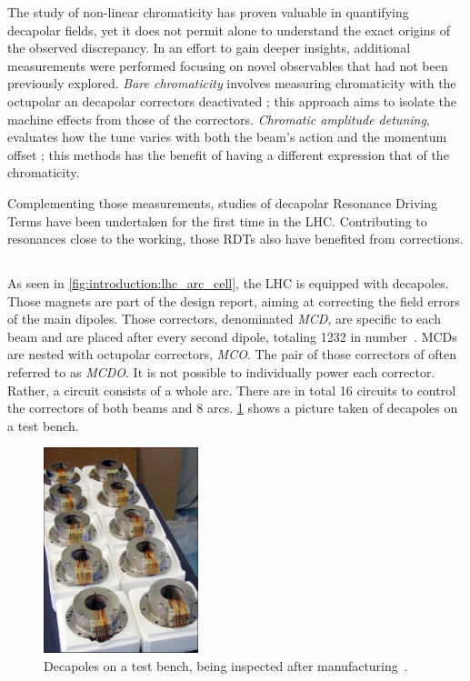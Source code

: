 The study of non-linear chromaticity has proven valuable in quantifying decapolar fields, yet it
does not permit alone to understand the exact origins of the observed discrepancy. In an effort to
gain deeper insights, additional measurements were performed focusing on novel observables that had
not been previously explored.
\textit{Bare chromaticity} involves measuring chromaticity with
the octupolar an decapolar correctors deactivated ; this approach aims to isolate the machine
effects from those of the correctors.
\textit{Chromatic amplitude detuning}, evaluates how the tune varies with both the beam's action and
the momentum offset ; this methods has the benefit of having a different expression that of the
chromaticity.

Complementing those measurements, studies of decapolar Resonance Driving Terms have been undertaken
for the first time in the LHC. Contributing to resonances close to the working, those RDTs also have
benefited from corrections.


\subsection{}

As seen in \cref{fig:introduction:lhc_arc_cell}, the LHC is equipped with decapoles. Those magnets
are part of the design report, aiming at correcting the field errors of the main dipoles.
Those correctors, denominated \textit{MCD}, are specific to each beam and are placed after every
second dipole, totaling 1232 in number~\cite{venturini_delsolaro_magnetic_2005}.
MCDs are nested with octupolar correctors, \textit{MCO}. The pair of those correctors of often
referred to as \textit{MCDO}. 
It is not possible to individually power each corrector. Rather, a circuit consists of a whole arc.
There are in total 16 circuits to control the correctors of both beams and 8 arcs.
\cref{fig:decapoles:decapole_picture} shows a picture taken of decapoles on a test bench.

\begin{figure}
    \centering
    \includegraphics[width=0.4\textwidth]{./images/decapoles_real_pic.jpg}
    \caption{Decapoles on a test bench, being inspected after
    manufacturing~\cite{noauthor_ten_2001}.}
    \label{fig:decapoles:decapole_picture}
\end{figure}


